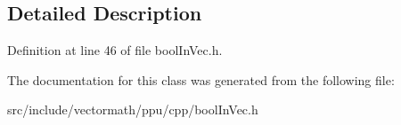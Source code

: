 \subsection{Detailed Description}


Definition at line 46 of file bool\-In\-Vec.\-h.



The documentation for this class was generated from the following file\-:\begin{DoxyCompactItemize}
\item 
src/include/vectormath/ppu/cpp/bool\-In\-Vec.\-h\end{DoxyCompactItemize}
